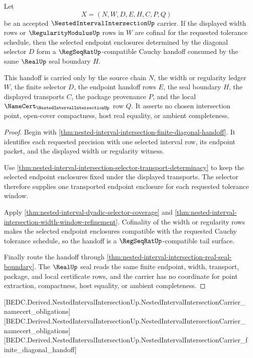 \begin{theorem}
\label{thm:nested-interval-intersection-width-tail-cauchy-handoff}
Let
$$
X=(N,W,D,E,H,C,P,Q)
$$
be an accepted $\NestedIntervalIntersectionUp$ carrier. If the displayed width rows or $\RegularityModulusUp$ rows in $W$ are cofinal for the requested tolerance schedule, then the selected endpoint enclosures determined by the diagonal selector $D$ form a $\RegSeqRatUp$-compatible Cauchy handoff consumed by the same $\RealUp$ seal boundary $H$.

This handoff is carried only by the source chain $N$, the width or regularity ledger $W$, the finite selector $D$, the endpoint handoff rows $E$, the seal boundary $H$, the displayed transports $C$, the package provenance $P$, and the local $\NameCert_{\NestedIntervalIntersectionUp}$ row $Q$. It asserts no chosen intersection point, open-cover compactness, host real equality, or ambient completeness.
\end{theorem}
\begin{proof}
Begin with \autoref{thm:nested-interval-intersection-finite-diagonal-handoff}. It identifies each requested precision with one selected interval row, its endpoint packet, and the displayed width or regularity witness.

Use \autoref{thm:nested-interval-intersection-selector-transport-determinacy} to keep the selected endpoint enclosures fixed under the displayed transports. The selector therefore supplies one transported endpoint enclosure for each requested tolerance window.

Apply \autoref{thm:nested-interval-dyadic-selector-coverage} and \autoref{thm:nested-interval-intersection-width-window-refinement}. Cofinality of the width or regularity rows makes the selected endpoint enclosures compatible with the requested Cauchy tolerance schedule, so the handoff is a $\RegSeqRatUp$-compatible tail surface.

Finally route the handoff through \autoref{thm:nested-interval-intersection-real-seal-boundary}. The $\RealUp$ seal reads the same finite endpoint, width, transport, package, and local certificate rows, and the carrier has no coordinate for point extraction, compactness, host equality, or ambient completeness.
\end{proof}

[BEDC.Derived.NestedIntervalIntersectionUp.NestedIntervalIntersectionCarrier\_namecert\_obligations]
[BEDC.Derived.NestedIntervalIntersectionUp.NestedIntervalIntersectionCarrier\_namecert\_obligations]
[BEDC.Derived.NestedIntervalIntersectionUp.NestedIntervalIntersectionCarrier\_finite\_diagonal\_handoff]

